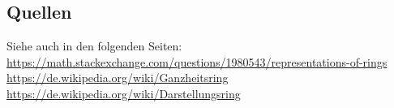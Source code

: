 \documentclass[a4paper]{amsart}
\theoremstyle{definition}
\begin{document}
\subsection*{Quellen}
Siehe auch in den folgenden Seiten:\\
\url{https://math.stackexchange.com/questions/1980543/representations-of-rings}\\
\url{https://de.wikipedia.org/wiki/Ganzheitsring}\\
\url{https://de.wikipedia.org/wiki/Darstellungsring}\\
\url{}\\
\url{}\\
\url{}\\
\url{}\\
\url{}\\
\url{}\\
\url{}\\
\url{}\\
\url{}\\
\url{}\\
\url{}\\
\url{}\\
\url{}\\
\url{}\\
\url{}\\
\url{}\\

\end{document}
